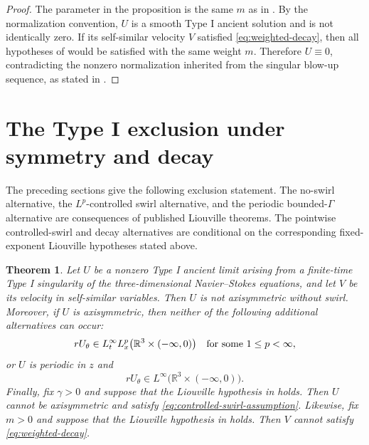 \documentclass[11pt]{amsart}
\theoremstyle{plain}
\newtheorem{theorem}{Theorem}[section]
\theoremstyle{definition}
\theoremstyle{remark}
\numberwithin{equation}{section}
\begin{document}
\begin{proof}
The parameter in the proposition is the same \(m\) as in .
By the normalization convention, \(U\) is a smooth Type I ancient solution and
is not identically zero.  If its
self-similar velocity \(V\) satisfied \eqref{eq:weighted-decay}, then all
hypotheses of  would be satisfied with the same weight
\(m\).  Therefore \(U\equiv0\), contradicting the nonzero normalization
inherited from the singular blow-up sequence, as stated in
.
\end{proof}

\section{The Type I exclusion under symmetry and decay}

The preceding sections give the following exclusion statement.  The no-swirl
alternative, the \(L^p\)-controlled swirl alternative, and the periodic
bounded-\(\Gamma\) alternative are consequences of published Liouville
theorems.  The pointwise controlled-swirl and decay alternatives are
conditional on the corresponding fixed-exponent Liouville hypotheses stated
above.

\begin{theorem}\label{thm:symmetry-decay-exclusion}
Let \(U\) be a nonzero Type I ancient limit arising from a finite-time Type I
singularity of the three-dimensional Navier--Stokes equations, and let \(V\) be
its velocity in self-similar variables.  Then \(U\) is not axisymmetric without
swirl.  Moreover, if \(U\) is axisymmetric, then neither of the following
additional alternatives can occur:
\[
   rU_\theta\in L_t^\infty L_x^p
      \bigl(\mathbb R^3\times(-\infty,0)\bigr)
      \quad\hbox{for some }1\le p<\infty,
\]
or \(U\) is periodic in \(z\) and
\[
   rU_\theta\in L^\infty\bigl(\mathbb R^3\times(-\infty,0)\bigr).
\]
Finally, fix \(\gamma>0\) and suppose that the Liouville hypothesis in
 holds.  Then \(U\) cannot be axisymmetric and satisfy
\eqref{eq:controlled-swirl-assumption}.  Likewise, fix \(m>0\) and suppose that
the Liouville hypothesis in  holds.  Then \(V\) cannot satisfy
\eqref{eq:weighted-decay}.
\end{theorem}
\end{document}
